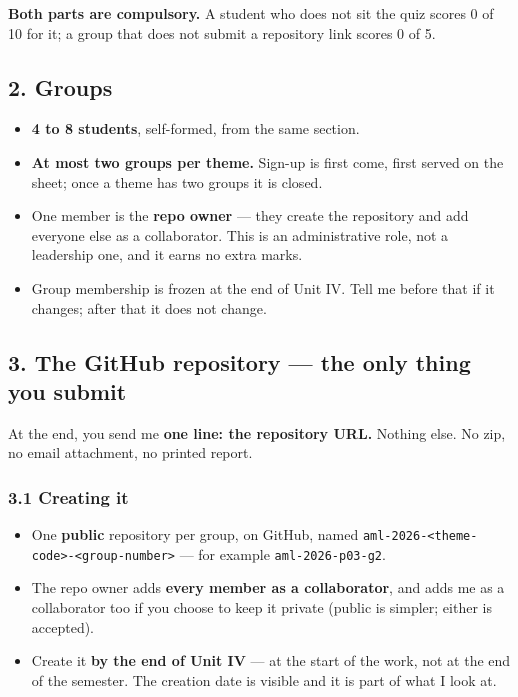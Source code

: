 \documentclass[11pt]{article}
\providecommand{\tightlist}{\setlength{\itemsep}{0pt}\setlength{\parskip}{0pt}}
\begin{document}
\textbf{Both parts are compulsory.} A student who does not sit the quiz scores 0 of 10
for it; a group that does not submit a repository link scores 0 of 5.



\hypertarget{groups}{%
\subsection{2. Groups}\label{groups}}

\begin{itemize}
\tightlist
\item
  \textbf{4 to 8 students}, self-formed, from the same section.
\item
  \textbf{At most two groups per theme.} Sign-up is first come, first served on the
  sheet; once a theme has two groups it is closed.
\item
  One member is the \textbf{repo owner} --- they create the repository and add everyone
  else as a collaborator. This is an administrative role, not a leadership one,
  and it earns no extra marks.
\item
  Group membership is frozen at the end of Unit IV. Tell me before that if it
  changes; after that it does not change.
\end{itemize}



\hypertarget{the-github-repository-the-only-thing-you-submit}{%
\subsection{3. The GitHub repository --- the only thing you submit}\label{the-github-repository-the-only-thing-you-submit}}

At the end, you send me \textbf{one line: the repository URL.} Nothing else. No zip,
no email attachment, no printed report.

\hypertarget{creating-it}{%
\subsubsection{3.1 Creating it}\label{creating-it}}

\begin{itemize}
\tightlist
\item
  One \textbf{public} repository per group, on GitHub, named
  \texttt{aml-2026-\textless{}theme-code\textgreater{}-\textless{}group-number\textgreater{}} --- for example \texttt{aml-2026-p03-g2}.
\item
  The repo owner adds \textbf{every member as a collaborator}, and adds me as a
  collaborator too if you choose to keep it private (public is simpler; either
  is accepted).
\item
  Create it \textbf{by the end of Unit IV} --- at the start of the work, not at the end
  of the semester. The creation date is visible and it is part of what I look at.
\end{itemize}
\end{document}
